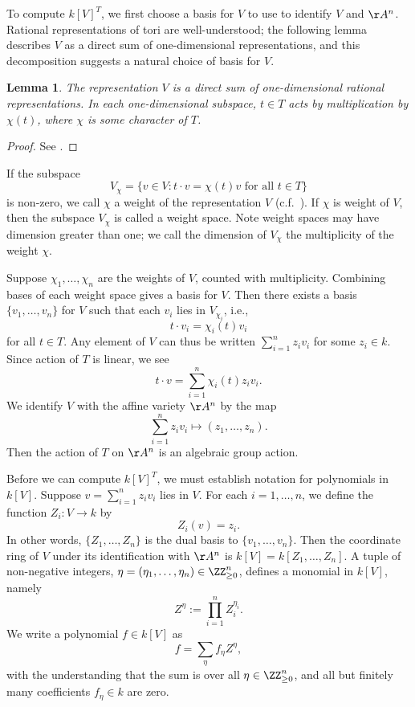 \documentclass[12pt]{amsart}
\theoremstyle{plain}
\newtheorem{lemma}[theorem]{Lemma}
\begin{document}
To compute $k[V]^T$, we first choose a basis for $V$ to use to identify $V$ and $\AA^n$.
Rational representations of tori are well-understood; 
the following lemma describes $V$ as a direct sum of one-dimensional representations, and this decomposition suggests a natural choice of basis for $V$.

\begin{lemma}
The representation $V$ is a direct sum of one-dimensional rational representations.
In each one-dimensional subspace, $t \in T$ acts by multiplication by $\chi(t)$, where $\chi$ is some character of $T$.
\end{lemma}
\begin{proof}
See \cite[3.2.3]{Springer98}.
\end{proof}

If the subspace
$$V_\chi = \{v \in V : t \cdot v = \chi(t) v \text{ for all } t \in T\}$$
is non-zero, we call $\chi$ a weight of the representation $V$ (c.f.\ \cite[7.1.1]{Springer98}).
If $\chi$ is weight of $V$, then the subspace $V_\chi$ is called a weight space.
Note weight spaces may have dimension greater than one; we call the dimension of $V_\chi$ the multiplicity of the weight $\chi$.

Suppose $\chi_1, \ldots, \chi_n$ are the weights of $V$, counted with multiplicity.
Combining bases of each weight space gives a basis for $V$.
Then there exists a basis $\{v_1, \ldots, v_n\}$ for $V$ such that each $v_i$ lies in $V_{\chi_i}$, i.e.,
$$t \cdot v_i = \chi_i(t) v_i$$
for all $t \in T$.
Any element of $V$ can thus be written $\sum_{i=1}^n z_i v_i$ for some $z_i \in k$.
Since action of $T$ is linear, we see
$$t \cdot v = \sum_{i=1}^n  \chi_i(t) z_i v_i.$$
We identify $V$ with the affine variety $\AA^n$ by the map 
$$\sum_{i=1}^n z_i v_i \mapsto (z_1, \ldots, z_n).$$
Then the action of $T$ on $\AA^n$ is an algebraic group action.

Before we can compute $k[V]^T$, we must establish notation for polynomials in $k[V]$.
Suppose $v = \sum_{i=1}^n z_i v_i$ lies in $V$.
For each $i=1, \ldots, n$, we define the function $Z_i : V \to k$ by
$$Z_i(v) = z_i.$$
In other words, $\{Z_1, \ldots, Z_n\}$ is the dual basis to $\{v_1, \ldots, v_n\}$.
Then the coordinate ring of $V$ under its identification with $\AA^n$ is $k[V] = k[Z_1, \ldots, Z_n]$.
A tuple of non-negative integers, $\eta = (\eta_1, \ldots, \eta_n) \in \ZZ_{\ge 0}^n$, defines a monomial in $k[V]$, namely
$$Z^\eta := \prod_{i=1}^n Z_i^{\eta_i}.$$
We write a polynomial $f \in k[V]$ as
$$f = \sum_\eta f_\eta Z^\eta,$$
with the understanding that the sum is over all $\eta \in \ZZ_{\ge 0}^n$, and all but finitely many coefficients $f_\eta \in k$ are zero.
\end{document}
